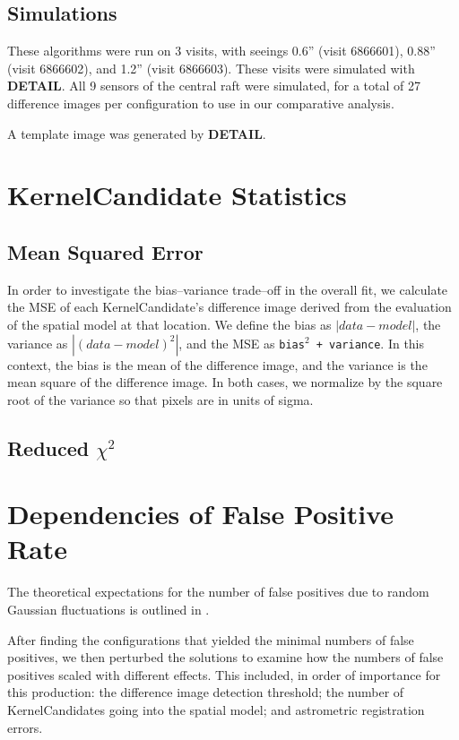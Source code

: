 \documentclass[prd, nofootinbib, floatfix, 11pt,tightenlines,times]{article}
\begin{document}
\subsection{Simulations}

These algorithms were run on 3 visits, with seeings 0.6'' (visit
6866601), 0.88'' (visit 6866602), and 1.2'' (visit 6866603).  These
visits were simulated with {\bf DETAIL}.  All 9 sensors of the central
raft were simulated, for a total of 27 difference images per
configuration to use in our comparative analysis.

A template image was generated by {\bf DETAIL}.  

\section{KernelCandidate Statistics}

\subsection{Mean Squared Error}

In order to investigate the bias--variance trade--off in the overall
fit, we calculate the MSE of each KernelCandidate's difference image
derived from the evaluation of the spatial model at that location.  We
define the bias as $\left| data - model \right|$, the variance as
$\left| (data - model)^2 \right|$, and the MSE as {\tt bias$^2$ +
  variance}.  In this context, the bias is the mean of the difference
image, and the variance is the mean square of the difference image.
In both cases, we normalize by the square root of the variance so that
pixels are in units of sigma.

\subsection{Reduced $\chi^2$}

\section{Dependencies of False Positive Rate}

The theoretical expectations for the number of false positives due to
random Gaussian fluctuations is outlined in \cite{Kaiser-PointSources}.

After finding the configurations that yielded the minimal numbers of
false positives, we then perturbed the solutions to examine how the
numbers of false positives scaled with different effects.  This
included, in order of importance for this production: the difference
image detection threshold; the number of KernelCandidates going into
the spatial model; and astrometric registration errors.
\end{document}
